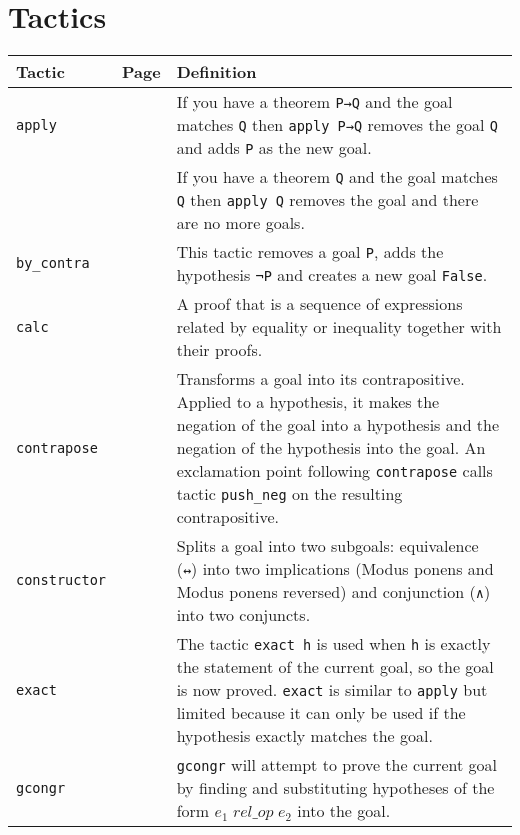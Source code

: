 \newpage


\section{Tactics}\label{a.tactics}

\begin{tabular}{p{}|r|p{}}
\hline
Tactic & Page & Definition\\
\hline
\Verb+apply+&\pageref{p.apply}&If you have a theorem \Verb+P→Q+ and the goal matches \Verb+Q+ then \Verb+apply P→Q+ removes the goal \Verb+Q+ and adds \Verb+P+ as the new goal.\\
&&If you have a theorem \Verb+Q+ and the goal matches \Verb+Q+ then \Verb+apply Q+ removes the goal and there are no more goals.\\\hline

\Verb+by_contra+&\pageref{p.by-contra}&This tactic removes a goal \Verb+P+, adds the hypothesis \Verb+¬P+ and creates a new goal \Verb+False+.\\\hline

\Verb+calc+&\pageref{p.calc}&A proof that is a sequence of expressions related by equality or inequality together with their proofs.\\\hline

\Verb+contrapose+&\pageref{p.contrapose}&Transforms a goal into its contrapositive. Applied to a hypothesis, it makes the negation of the goal into a hypothesis and the negation of the hypothesis into the goal. 
An exclamation point following \Verb+contrapose+ calls tactic \Verb+push_neg+ on the resulting contrapositive.\\\hline

\Verb+constructor+&\pageref{p.constructor}&Splits a goal into two subgoals: equivalence (\Verb+↔+) into two implications (Modus ponens and Modus ponens reversed) and conjunction (\Verb+∧+) into two conjuncts.\\\hline

\Verb+exact+&\pageref{p.exact}&The tactic \Verb+exact h+ is used when \Verb+h+ is exactly the statement of the current goal, so the goal is now proved. \Verb+exact+ is similar to \Verb+apply+ but limited because it can only be used if the hypothesis exactly matches the goal.\\\hline

\Verb+gcongr+&\pageref{p.gcongr}&\Verb+gcongr+ will attempt to prove the current goal by finding and substituting hypotheses of the form $\mathit{e_1 \; rel\_op \; e_2}$ into the goal.\\\hline


\end{tabular}
